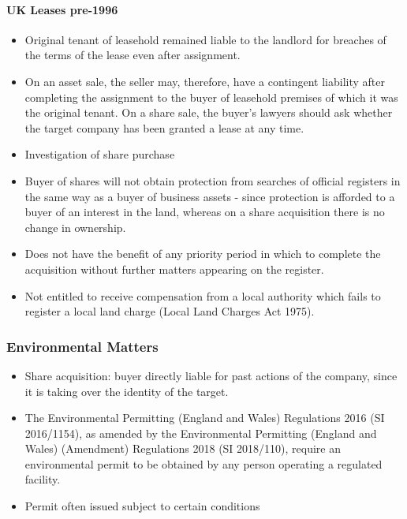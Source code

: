 \documentclass[
]{article}
\providecommand{\tightlist}{%
  \setlength{\itemsep}{0pt}\setlength{\parskip}{0pt}}
\begin{document}
\hypertarget{uk-leases-pre-1996}{%
\paragraph{UK Leases pre-1996}\label{uk-leases-pre-1996}}

\begin{itemize}
\tightlist
\item
  Original tenant of leasehold remained liable to the landlord for
  breaches of the terms of the lease even after assignment.
\item
  On an asset sale, the seller may, therefore, have a contingent
  liability after completing the assignment to the buyer of leasehold
  premises of which it was the original tenant. On a share sale, the
  buyer's lawyers should ask whether the target company has been granted
  a lease at any time.
\item
  Investigation of share purchase
\item
  Buyer of shares will not obtain protection from searches of official
  registers in the same way as a buyer of business assets - since
  protection is afforded to a buyer of an interest in the land, whereas
  on a share acquisition there is no change in ownership.
\item
  Does not have the benefit of any priority period in which to complete
  the acquisition without further matters appearing on the register.
\item
  Not entitled to receive compensation from a local authority which
  fails to register a local land charge (Local Land Charges Act 1975).
\end{itemize}

\hypertarget{environmental-matters}{%
\subsubsection{Environmental Matters}\label{environmental-matters}}

\begin{itemize}
\tightlist
\item
  Share acquisition: buyer directly liable for past actions of the
  company, since it is taking over the identity of the target.
\item
  The Environmental Permitting (England and Wales) Regulations 2016 (SI
  2016/1154), as amended by the Environmental Permitting (England and
  Wales) (Amendment) Regulations 2018 (SI 2018/110), require an
  environmental permit to be obtained by any person operating a
  regulated facility.
\item
  Permit often issued subject to certain conditions
\end{itemize}
\end{document}
